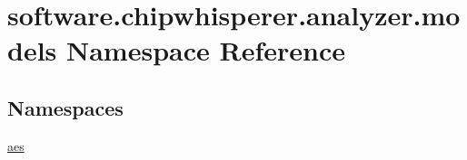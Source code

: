\hypertarget{namespacesoftware_1_1chipwhisperer_1_1analyzer_1_1models}{}\section{software.\+chipwhisperer.\+analyzer.\+models Namespace Reference}
\label{namespacesoftware_1_1chipwhisperer_1_1analyzer_1_1models}
\subsection*{Namespaces}
\begin{DoxyCompactItemize}
\item 
 \hyperlink{namespacesoftware_1_1chipwhisperer_1_1analyzer_1_1models_1_1aes}{aes}
\end{DoxyCompactItemize}
